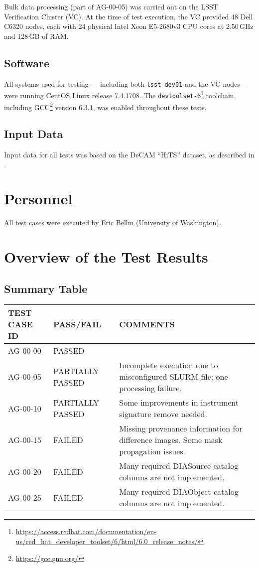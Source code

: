 \documentclass[DM,lsstdraft,STR,toc]{lsstdoc}
\begin{document}
Bulk data processing (part of AG-00-05) was carried out on the LSST Verification Cluster (VC).
At the time of test execution, the VC provided 48 Dell C6320 nodes, each with 24 physical Intel Xeon E5-2680v3 CPU cores at 2.50\,GHz and 128\,GB of RAM.

\subsection{Software}
\label{sect:swconf}

All systems used for testing --- including both \texttt{lsst-dev01} and the VC nodes --- were running CentOS Linux release 7.4.1708.
The \texttt{devtoolset-6}\footnote{\url{https://access.redhat.com/documentation/en-us/red_hat_developer_toolset/6/html/6.0_release_notes/}} toolchain, including GCC\footnote{\url{https://gcc.gnu.org/}} version 6.3.1, was enabled throughout these tests.

\subsection{Input Data}
\label{sect:inputdata}

Input data for all tests was based on the DeCAM “HiTS” dataset, as described in .

\section{Personnel}
\label{sect:personnel}

All test cases were executed by Eric Bellm (University of Washington).

\newpage

\section{Overview of the Test Results}
\label{sect:overview}

\subsection{Summary Table}
\label{sect:summarytable}

\begin{longtable} {|p{}|p{}|p{}|}\hline
{\bf TEST CASE ID} & {\bf PASS/FAIL} & {\bf COMMENTS} \\\hline
AG-00-00 & PASSED & \\\hline
AG-00-05 & PARTIALLY PASSED & Incomplete execution due to misconfigured SLURM file; one processing failure. \\\hline
AG-00-10 & PARTIALLY PASSED & Some improvements in instrument signature remove needed. \\\hline
AG-00-15 & FAILED & Missing provenance information for difference images. Some mask propagation issues. \\\hline
AG-00-20 & FAILED & Many required DIASource catalog columns are not implemented. \\\hline
AG-00-25 & FAILED & Many required DIAObject catalog columns are not implemented. \\\hline
\end{longtable}
\end{document}
